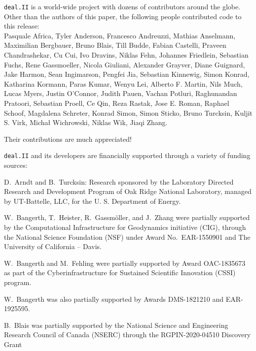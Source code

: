 \documentclass{ansarticle-preprint}
\newcommand{\specialword}[1]{\texttt{#1}}
\newcommand{\dealii}{{\specialword{deal.II}}\xspace}
\begin{document}
\dealii{} is a world-wide project with dozens of contributors around the
globe. Other than the authors of this paper, the following people
contributed code to this release:\\
%
%
Pasquale	Africa,
Tyler	Anderson,
Francesco	Andreuzzi,
Mathias	Anselmann,
Maximilian	Bergbauer,
Bruno	Blais,
Till	Budde,
Fabian	Castelli,
Praveen	Chandrashekar,
Cu	Cui,
Ivo	Dravins,
Niklas	Fehn,
Johannes	Friedlein,
Sebastian	Fuchs,
Rene	Gassmoeller,
Nicola	Giuliani,
Alexander	Grayver,
Diane	Guignard,
Jake	Harmon,
Sean	Ingimarson,
Pengfei	Jia,
Sebastian	Kinnewig,
Simon	Konrad,
Katharina	Kormann,
Paras	Kumar,
Wenyu	Lei,
Alberto F.	Martin,
Nils	Much,
Lucas	Myers,
Justin	O'Connor,
Judith	Pauen,
Vachan	Potluri,
Raghunandan	Pratoori,
Sebastian	Proell,
Ce	Qin,
Reza	Rastak,
Jose E.	Roman,
Raphael	Schoof,
Magdalena	Schreter,
Konrad	Simon,
Simon	Sticko,
Bruno	Turcksin,
Kuljit S.	Virk,
Michał	Wichrowski,
Niklas Wik,
Jiaqi	Zhang.


Their contributions are much appreciated!


\bigskip

\dealii{} and its developers are financially supported through a
variety of funding sources:


D.~Arndt and B.~Turcksin: Research sponsored by the Laboratory Directed Research and
Development Program of Oak Ridge National Laboratory, managed by UT-Battelle,
LLC, for the U. S. Department of Energy.

W.~Bangerth, T.~Heister, R.~Gassm{\"o}ller, and J.~Zhang were partially
supported by the Computational Infrastructure for Geodynamics initiative
(CIG), through the National Science Foundation (NSF) under Award
No.~EAR-1550901 and The University of California -- Davis.

W.~Bangerth and M.~Fehling were partially supported by Award OAC-1835673
as part of the Cyberinfrastructure for Sustained Scientific Innovation (CSSI)
program.

W.~Bangerth was also partially supported by Awards DMS-1821210 and EAR-1925595.

B.~Blais was partially supported by the National Science and Engineering
Research Council of Canada (NSERC)  through the RGPIN-2020-04510 Discovery
Grant
\end{document}
